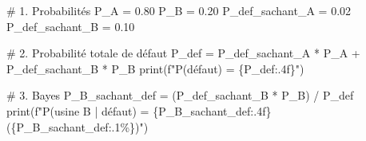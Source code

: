 \documentclass[
  french,
  11pt,
  a4paper,
]{scrbook}
\newenvironment{Shaded}{}{}
\newcommand{\BuiltInTok}[1]{\textcolor[rgb]{0.84,0.23,0.29}{#1}}
\newcommand{\CommentTok}[1]{\textcolor[rgb]{0.42,0.45,0.49}{#1}}
\newcommand{\FloatTok}[1]{\textcolor[rgb]{0.00,0.36,0.77}{#1}}
\newcommand{\NormalTok}[1]{\textcolor[rgb]{0.14,0.16,0.18}{#1}}
\newcommand{\OperatorTok}[1]{\textcolor[rgb]{0.14,0.16,0.18}{#1}}
\newcommand{\SpecialCharTok}[1]{\textcolor[rgb]{0.00,0.36,0.77}{#1}}
\newcommand{\SpecialStringTok}[1]{\textcolor[rgb]{0.01,0.18,0.38}{#1}}
\begin{document}
\begin{tcolorbox}[enhanced jigsaw, arc=.35mm, bottomrule=.15mm, bottomtitle=1mm, breakable, colback=white, colbacktitle=quarto-callout-tip-color!10!white, colframe=quarto-callout-tip-color-frame, coltitle=black, left=2mm, leftrule=.75mm, opacityback=0, opacitybacktitle=0.6, rightrule=.15mm, title=\textcolor{quarto-callout-tip-color}{\faLightbulb}\hspace{0.5em}{✅ Voir la correction}, titlerule=0mm, toprule=.15mm, toptitle=1mm]

\begin{Shaded}
\begin{Highlighting}[]
\CommentTok{\# 1. Probabilités}
\NormalTok{P\_A }\OperatorTok{=} \FloatTok{0.80}
\NormalTok{P\_B }\OperatorTok{=} \FloatTok{0.20}
\NormalTok{P\_def\_sachant\_A }\OperatorTok{=} \FloatTok{0.02}
\NormalTok{P\_def\_sachant\_B }\OperatorTok{=} \FloatTok{0.10}

\CommentTok{\# 2. Probabilité totale de défaut}
\NormalTok{P\_def }\OperatorTok{=}\NormalTok{ P\_def\_sachant\_A }\OperatorTok{*}\NormalTok{ P\_A }\OperatorTok{+}\NormalTok{ P\_def\_sachant\_B }\OperatorTok{*}\NormalTok{ P\_B}
\BuiltInTok{print}\NormalTok{(}\SpecialStringTok{f"P(défaut) = }\SpecialCharTok{\{}\NormalTok{P\_def}\SpecialCharTok{:.4f\}}\SpecialStringTok{"}\NormalTok{)}

\CommentTok{\# 3. Bayes}
\NormalTok{P\_B\_sachant\_def }\OperatorTok{=}\NormalTok{ (P\_def\_sachant\_B }\OperatorTok{*}\NormalTok{ P\_B) }\OperatorTok{/}\NormalTok{ P\_def}
\BuiltInTok{print}\NormalTok{(}\SpecialStringTok{f"P(usine B | défaut) = }\SpecialCharTok{\{}\NormalTok{P\_B\_sachant\_def}\SpecialCharTok{:.4f\}}\SpecialStringTok{ (}\SpecialCharTok{\{}\NormalTok{P\_B\_sachant\_def}\SpecialCharTok{:.1\%\}}\SpecialStringTok{)"}\NormalTok{)}


\end{Highlighting}
\end{Shaded}
\end{tcolorbox}
\end{document}
